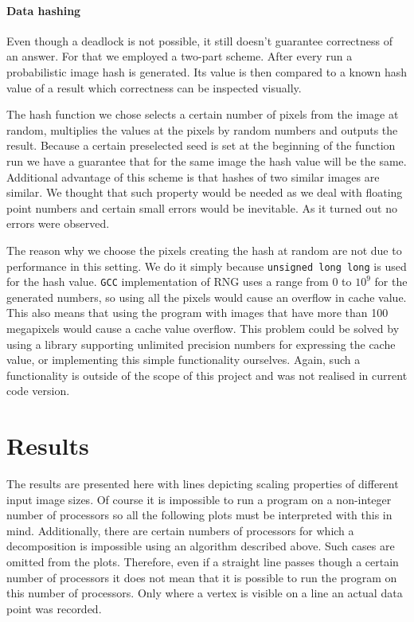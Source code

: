 \documentclass[11pt,a4paper]{article}
\begin{document}
\paragraph{Data hashing}
Even though a deadlock is not possible, it still doesn't guarantee correctness of an answer.
For that we employed a two-part scheme.
After every run a probabilistic image hash is generated.
Its value is then compared to a known hash value of a result which correctness can be inspected visually.

The hash function we chose selects a certain number of pixels from the image at random, multiplies the values at the pixels by random numbers and outputs the result.
Because a certain preselected seed is set at the beginning of the function run we have a guarantee that for the same image the hash value will be the same.
Additional advantage of this scheme is that hashes of two similar images are similar.
We thought that such property would be needed as we deal with floating point numbers and certain small errors would be inevitable.
As it turned out no errors were observed.

The reason why we choose the pixels creating the hash at random are not due to performance in this setting.
We do it simply because \texttt{unsigned long long} is used for the hash value.
\texttt{GCC} implementation of RNG uses a range from $0$ to $10^9$ for the generated numbers, so using all the pixels would cause an overflow in cache value.
This also means that using the program with images that have more than 100 megapixels would cause a cache value overflow.
This problem could be solved by using a library supporting unlimited precision numbers for expressing the cache value, or implementing this simple functionality ourselves.
Again, such a functionality is outside of the scope of this project and was not realised in current code version.

\label{sec:correctness}

\section{Results}
The results are presented here with lines depicting scaling properties of different input image sizes.
Of course it is impossible to run a program on a non-integer number of processors so all the following plots must be interpreted with this in mind.
Additionally, there are certain numbers of processors for which a decomposition is impossible using an algorithm described above.
Such cases are omitted from the plots.
Therefore, even if a straight line passes though a certain number of processors it does not mean that it is possible to run the program on this number of processors.
Only where a vertex is visible on a line an actual data point was recorded.
\end{document}
